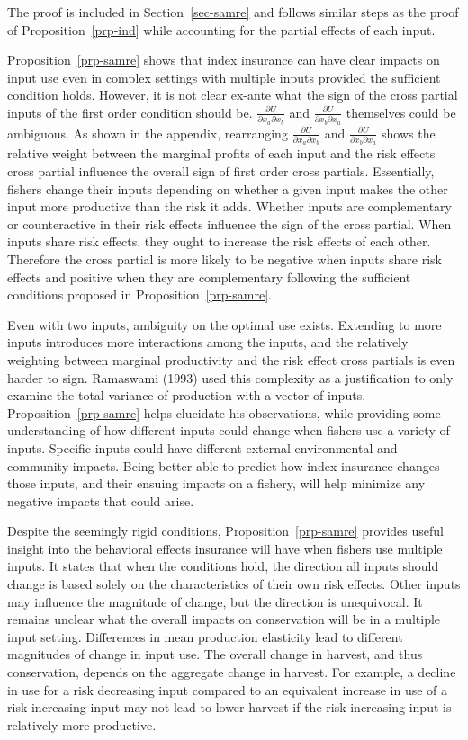\documentclass[
  letterpaper,
  DIV=11,
  numbers=noendperiod]{scrartcl}
\theoremstyle{plain}
\theoremstyle{plain}
\theoremstyle{remark}
\begin{document}
The proof is included in Section~\ref{sec-samre} and follows similar
steps as the proof of Proposition~\ref{prp-ind} while accounting for the
partial effects of each input.

Proposition~\ref{prp-samre} shows that index insurance can have clear
impacts on input use even in complex settings with multiple inputs
provided the sufficient condition holds. However, it is not clear
ex-ante what the sign of the cross partial inputs of the first order
condition should be. \(\frac{\partial U}{\partial x_a\partial x_b}\) and
\(\frac{\partial U}{\partial x_b\partial x_a}\) themselves could be
ambiguous. As shown in the appendix, rearranging
\(\frac{\partial U}{\partial x_a\partial x_b}\) and
\(\frac{\partial U}{\partial x_b\partial x_a}\) shows the relative
weight between the marginal profits of each input and the risk effects
cross partial influence the overall sign of first order cross partials.
Essentially, fishers change their inputs depending on whether a given
input makes the other input more productive than the risk it adds.
Whether inputs are complementary or counteractive in their risk effects
influence the sign of the cross partial. When inputs share risk effects,
they ought to increase the risk effects of each other. Therefore the
cross partial is more likely to be negative when inputs share risk
effects and positive when they are complementary following the
sufficient conditions proposed in Proposition~\ref{prp-samre}.

Even with two inputs, ambiguity on the optimal use exists. Extending to
more inputs introduces more interactions among the inputs, and the
relatively weighting between marginal productivity and the risk effect
cross partials is even harder to sign. Ramaswami (1993) used this
complexity as a justification to only examine the total variance of
production with a vector of inputs. Proposition~\ref{prp-samre} helps
elucidate his observations, while providing some understanding of how
different inputs could change when fishers use a variety of inputs.
Specific inputs could have different external environmental and
community impacts. Being better able to predict how index insurance
changes those inputs, and their ensuing impacts on a fishery, will help
minimize any negative impacts that could arise.

Despite the seemingly rigid conditions, Proposition~\ref{prp-samre}
provides useful insight into the behavioral effects insurance will have
when fishers use multiple inputs. It states that when the conditions
hold, the direction all inputs should change is based solely on the
characteristics of their own risk effects. Other inputs may influence
the magnitude of change, but the direction is unequivocal. It remains
unclear what the overall impacts on conservation will be in a multiple
input setting. Differences in mean production elasticity lead to
different magnitudes of change in input use. The overall change in
harvest, and thus conservation, depends on the aggregate change in
harvest. For example, a decline in use for a risk decreasing input
compared to an equivalent increase in use of a risk increasing input may
not lead to lower harvest if the risk increasing input is relatively
more productive.
\end{document}
